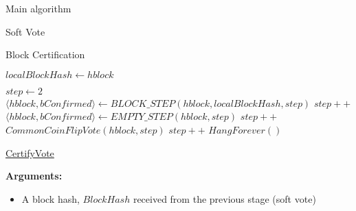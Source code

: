 \documentclass[10pt,a4paper]{article}
\begin{document}
\begin{section}{Main algorithm}
\begin{subsection}{Soft Vote}
\end{subsection}
\begin{subsection}{Block Certification}
    \begin{algorithm}[H]
        \begin{algorithmic}[H]
        \State $localBlockHash \gets hblock$
    
        \State $step \gets 2$
            \\
            \State $\langle hblock, bConfirmed \rangle \gets BLOCK\_STEP(hblock, localBlockHash, step)$
            \EndIf
            \State $step++$\\
       
            \State $ \langle hblock, bConfirmed \rangle \gets EMPTY\_STEP(hblock,step)$
            \EndIf
            \State $step++$\\
    
            \State $CommonCoinFlipVote(hblock, step)$
            \State $step++$
        \EndWhile
        \State $HangForever()$
        \EndFunction
        \end{algorithmic}
        \caption{\underline{CertifyVote}}
    \end{algorithm}
    
\noindent \textbf{Arguments:}
\begin{itemize}
    \item A block hash, $BlockHash$ received from the previous stage (soft vote)
  \end{itemize}


\end{subsection}
\end{section}
\end{document}
